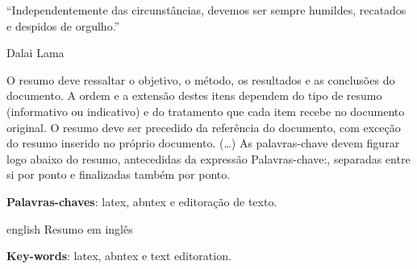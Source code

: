 \begin{epigrafe}	
``Independentemente das circunstâncias, devemos ser sempre humildes, recatados e despidos de orgulho.''
\\
\par
Dalai Lama 
\end{epigrafe}




\begin{resumo}
 O resumo deve ressaltar o
 objetivo, o método, os resultados e as conclusões do documento. A ordem e a extensão
 destes itens dependem do tipo de resumo (informativo ou indicativo) e do
 tratamento que cada item recebe no documento original. O resumo deve ser
 precedido da referência do documento, com exceção do resumo inserido no
 próprio documento. (\ldots) As palavras-chave devem figurar logo abaixo do
 resumo, antecedidas da expressão Palavras-chave:, separadas entre si por
 ponto e finalizadas também por ponto.

 \vspace{\onelineskip}
    
 \noindent
 \textbf{Palavras-chaves}: latex, abntex e editoração de texto.
\end{resumo}



\begin{resumo}[Abstract]
 \begin{otherlanguage*}{english}
	Resumo em inglês
   \vspace{\onelineskip}
 
   \noindent 
   \textbf{Key-words}: latex, abntex e text editoration.
 \end{otherlanguage*}
\end{resumo}

\listoffigures*
\cleardoublepage

\listoftables*
\cleardoublepage
